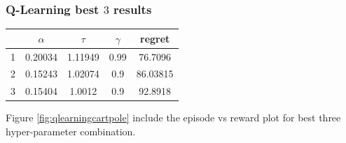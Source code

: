 \documentclass[11pt, a4]{article}
\begin{document}
			\subsubsection{Q-Learning best $3$ results}
				\begin{center}
					\begin{tabular}{|c|c|c|c|c|}
						\hline
						& $\alpha$ & $\tau$ &$\gamma$ &regret\\
						\hline
						1 & 0.20034  & 1.11949  & 0.99 &76.7096\\
						\hline
						2 & 0.15243 & 1.02074 & 0.9 & 86.03815\\
						\hline
						3 & 0.15404 & 1.0012 & 0.9 & 92.8918\\
						\hline
					\end{tabular}
				\end{center}
					Figure \ref{fig:qlearningcartpole} include the episode vs reward plot for best three hyper-parameter combination.
\end{document}
